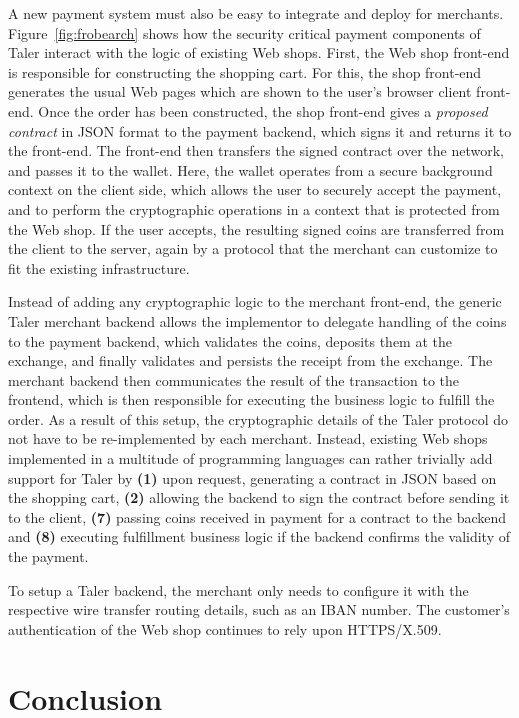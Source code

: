 \documentclass[twoside,letterpaper]{sigalternate}
\begin{document}
A new payment system must also be easy to integrate and deploy for merchants.
Figure~\ref{fig:frobearch} shows how the security critical payment components of
Taler interact with the logic of existing Web shops.  First, the Web shop
front-end is responsible for constructing the shopping cart.  For this,
the shop front-end generates the usual Web pages which are shown to the
user's browser client front-end.  Once the order has been constructed,
the shop front-end gives a {\em proposed contract} in JSON format to
the payment backend, which signs it and returns it to the front-end.
The front-end then transfers the signed contract over the network, and
passes it to the wallet.  Here, the wallet operates from a secure
background context on the client side, which allows the user to securely
accept the payment, and to perform the cryptographic operations in a
context that is protected from the Web shop.  If the user accepts, the
resulting signed coins are transferred from the client to the server,
again by a protocol that the merchant can customize to fit the
existing infrastructure.



Instead of adding any cryptographic logic to the merchant front-end,
the generic Taler merchant backend allows the implementor to delegate
handling of the coins to the payment backend, which validates the
coins, deposits them at the exchange, and finally validates and
persists the receipt from the exchange.  The merchant backend then
communicates the result of the transaction to the front\-end, which is
then responsible for executing the business logic to fulfill the
order.
As a result of this setup, the cryptographic details of the
Taler protocol do not have to be re-implemented by each merchant.
Instead, existing Web shops implemented in a multitude of programming
languages can rather trivially add support for Taler by {\bf (1)} upon
request, generating a contract in JSON based on the shopping cart,
{\bf (2)} allowing the backend to sign the contract before sending it
to the client, {\bf (7)} passing coins received in payment for a
contract to the backend and {\bf (8)} executing fulfillment business
logic if the backend confirms the validity of the payment.


To setup a Taler backend, the merchant only needs to configure it with the
respective wire transfer routing details, such as an IBAN number.  The
customer's authentication of the Web shop continues to rely upon
\mbox{HTTPS}/X.509.

\section{Conclusion}
\end{document}
